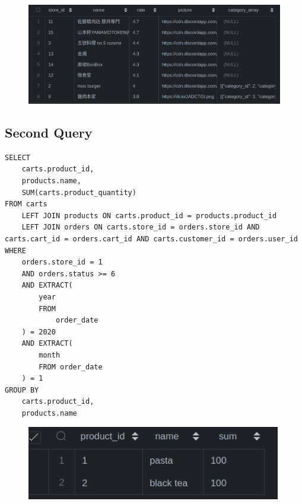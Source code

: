 \documentclass[a4paper, 12pt]{article}
\begin{document}
\newpage
{}
\begin{figure}[hp]
    \centerline{\includegraphics[width=40em]{result/result-1.png}}
    \label{fig:enter-label}
\end{figure}
\newline
\newpage

\subsection{Second Query}
\begin{lstlisting}
SELECT
    carts.product_id,
    products.name,
    SUM(carts.product_quantity)
FROM carts
    LEFT JOIN products ON carts.product_id = products.product_id
    LEFT JOIN orders ON carts.store_id = orders.store_id AND carts.cart_id = orders.cart_id AND carts.customer_id = orders.user_id
WHERE
    orders.store_id = 1
    AND orders.status >= 6
    AND EXTRACT(
        year
        FROM
            order_date
    ) = 2020
    AND EXTRACT(
        month
        FROM order_date
    ) = 1
GROUP BY
    carts.product_id,
    products.name
\end{lstlisting}
\begin{figure}[hp]
    \centerline{\includegraphics[width=30em]{result/result-2.png}}
    \label{fig:enter-label}
\end{figure}

\newpage
\end{document}
